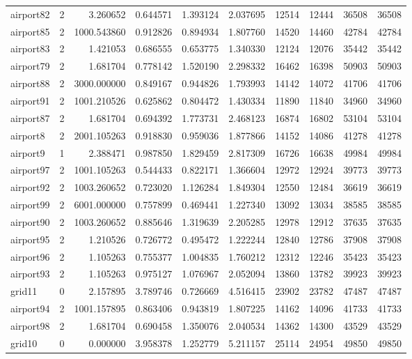 \begin{longtable}{|l|r|r|r|r|r|r|r|r|r|}
airport82 & 2 & 3.260652 & 0.644571 & 1.393124 & 2.037695 & 12514 & 12444 & 36508 & 36508 \\
airport85 & 2 & 1000.543860 & 0.912826 & 0.894934 & 1.807760 & 14520 & 14460 & 42784 & 42784 \\
airport83 & 2 & 1.421053 & 0.686555 & 0.653775 & 1.340330 & 12124 & 12076 & 35442 & 35442 \\
airport79 & 2 & 1.681704 & 0.778142 & 1.520190 & 2.298332 & 16462 & 16398 & 50903 & 50903 \\
airport88 & 2 & 3000.000000 & 0.849167 & 0.944826 & 1.793993 & 14142 & 14072 & 41706 & 41706 \\
airport91 & 2 & 1001.210526 & 0.625862 & 0.804472 & 1.430334 & 11890 & 11840 & 34960 & 34960 \\
airport87 & 2 & 1.681704 & 0.694392 & 1.773731 & 2.468123 & 16874 & 16802 & 53104 & 53104 \\
airport8 & 2 & 2001.105263 & 0.918830 & 0.959036 & 1.877866 & 14152 & 14086 & 41278 & 41278 \\
airport9 & 1 & 2.388471 & 0.987850 & 1.829459 & 2.817309 & 16726 & 16638 & 49984 & 49984 \\
airport97 & 2 & 1001.105263 & 0.544433 & 0.822171 & 1.366604 & 12972 & 12924 & 39773 & 39773 \\
airport92 & 2 & 1003.260652 & 0.723020 & 1.126284 & 1.849304 & 12550 & 12484 & 36619 & 36619 \\
airport99 & 2 & 6001.000000 & 0.757899 & 0.469441 & 1.227340 & 13092 & 13034 & 38585 & 38585 \\
airport90 & 2 & 1003.260652 & 0.885646 & 1.319639 & 2.205285 & 12978 & 12912 & 37635 & 37635 \\
airport95 & 2 & 1.210526 & 0.726772 & 0.495472 & 1.222244 & 12840 & 12786 & 37908 & 37908 \\
airport96 & 2 & 1.105263 & 0.755377 & 1.004835 & 1.760212 & 12312 & 12246 & 35423 & 35423 \\
airport93 & 2 & 1.105263 & 0.975127 & 1.076967 & 2.052094 & 13860 & 13782 & 39923 & 39923 \\
grid11 & 0 & 2.157895 & 3.789746 & 0.726669 & 4.516415 & 23902 & 23782 & 47487 & 47487 \\
airport94 & 2 & 1001.157895 & 0.863406 & 0.943819 & 1.807225 & 14162 & 14096 & 41733 & 41733 \\
airport98 & 2 & 1.681704 & 0.690458 & 1.350076 & 2.040534 & 14362 & 14300 & 43529 & 43529 \\
grid10 & 0 & 0.000000 & 3.958378 & 1.252779 & 5.211157 & 25114 & 24954 & 49850 & 49850 \\

\end{longtable}
